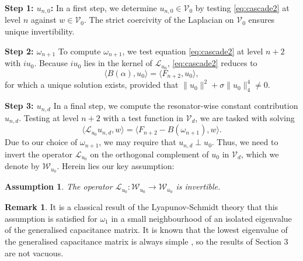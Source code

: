 \documentclass[a4paper,reqno,twoside]{amsart}
\numberwithin{equation}{section}
\newtheorem{assumption}{Assumption}
\theoremstyle{definition}
\newtheorem{remark}[theorem]{Remark}
\newcommand{\<}{\ensuremath \leq}
\renewcommand{\>}{\ensuremath \geq}
\begin{document}
\textbf{Step 1: $u_{n,0}$:} In a first step, we determine $u_{n,0} \in \mathcal{V}_0$ by testing \eqref{eq:cascade2} at level $n$ against $w \in \mathcal{V}_0$. The strict coercivity of the Laplacian on $\mathcal{V}_0$ ensures unique invertibility.


\textbf{Step 2: $\omega_{n+1}$} To compute $\omega_{n+1}$, we test equation \eqref{eq:cascade2} at level $n+2$ with $iu_0$. Because $iu_0$ lies in the kernel of $\mathcal{L}_{u_0}$, \eqref{eq:cascade2} reduces to
\begin{equation}
    \langle B(\alpha),u_0\rangle=\langle F_{n+2},u_0\rangle,
\end{equation}
for which a unique solution exists, provided that $\lVert u_0\rVert^2 + \sigma \lVert u_0\rVert_4^4\neq 0$.

\textbf{Step 3: $u_{n,d}$} In a final step, we compute the resonator-wise constant contribution $u_{n,d}$. Testing at level $n+2$ with a test function in $\mathcal{V}_d$, we are tasked with solving
\begin{equation}
    \langle \mathcal{L}_{u_0} u_{n,d},w\rangle = \langle F_{n+2} - B(\omega_{n+1}),w\rangle.
\end{equation}
Due to our choice of $\omega_{n+1}$, we may require that $u_{n,d}\perp u_0$. Thus, we need to invert the operator $\mathcal{L}_{u_0}$ on the orthogonal complement of $u_0$ in $\mathcal{V}_d$, which we denote by $\mathcal{W}_{u_0}$. Herein lies our key assumption:
\begin{assumption}\label{as:invertability}
    The operator $\mathcal{L}_{u_0}:\mathcal{W}_{u_0}\rightarrow\mathcal{W}_{u_0}$ is invertible.
\end{assumption}
\begin{remark}
    It is a classical result of the Lyapunov-Schmidt theory \cite{Kielhofer2012-hy,ambrosetti2007nonlinear} that this assumption is satisfied for $\omega_1$ in a small neighbourhood of an isolated eigenvalue of the generalised capacitance matrix. It is known that the lowest eigenvalue of the generalised capacitance matrix is always simple \cite{feppon2022modal}, so the results of Section $3$ are not vacuous.
\end{remark}


\end{document}
